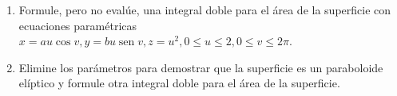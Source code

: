 \item 
    \begin{enumerate}
        \item[(a)] Formule, pero no evalúe, una integral doble para el área de la superficie con ecuaciones paramétricas $x = au \cos v, y = bu \operatorname{sen} v, z = u^2, 0 \le u \le 2, 0 \le v \le 2\pi$.
        \item[(b)] Elimine los parámetros para demostrar que la superficie es un paraboloide elíptico y formule otra integral doble para el área de la superficie.
    \end{enumerate}
